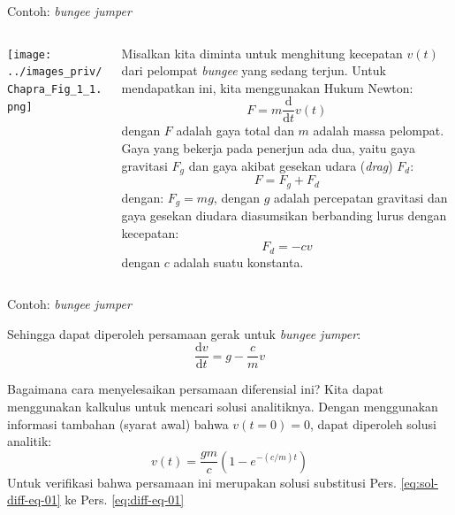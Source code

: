 \begin{frame}{Contoh: \emph{bungee jumper}}

\fontsize{9pt}{10pt}\selectfont

\begin{columns}

\begin{column}{0.2\textwidth}

\texttt{[image: ../images\_priv/Chapra\_Fig\_1\_1.png]}

\end{column}

\begin{column}{0.8\textwidth}
Misalkan kita diminta untuk menghitung kecepatan $v(t)$ dari pelompat
\emph{bungee} yang sedang terjun. Untuk mendapatkan ini, kita
menggunakan Hukum Newton:
\begin{equation*}
F = m \frac{\mathrm{d}}{\mathrm{d}t} v(t)
\end{equation*}
dengan $F$ adalah gaya total dan $m$ adalah massa pelompat.
Gaya yang bekerja pada penerjun ada dua, yaitu gaya gravitasi \(F_{g}\) dan
gaya akibat gesekan udara (\emph{drag})
$F_{d}$:
\begin{equation*}
F = F_{g} + F_{d}
\end{equation*}
dengan: $F_{g} = mg$, dengan $g$ adalah percepatan gravitasi dan gaya
gesekan diudara diasumsikan berbanding lurus dengan kecepatan:
\begin{equation*}
F_{d} = -c v  
\end{equation*}
dengan $c$ adalah suatu konstanta.
\end{column}

\end{columns}

\end{frame}


\begin{frame}{Contoh: \emph{bungee jumper}}

Sehingga dapat diperoleh persamaan gerak untuk \emph{bungee jumper}:
\begin{equation}
\frac{\mathrm{d}v}{\mathrm{d}t} = g - \frac{c}{m}v
\label{eq:diff-eq-01}
\end{equation}

Bagaimana cara menyelesaikan persamaan diferensial ini? Kita dapat
menggunakan kalkulus untuk mencari solusi analitiknya. Dengan
menggunakan informasi tambahan (syarat awal) bahwa $v(t=0)=0$, dapat
diperoleh solusi analitik:
\begin{equation}
v(t) = \frac{gm}{c}\left( 1 - e^{-(c/m)t} \right)
\label{eq:sol-diff-eq-01}
\end{equation}
Untuk verifikasi bahwa
persamaan ini merupakan solusi substitusi
Pers. \eqref{eq:sol-diff-eq-01} ke Pers. \eqref{eq:diff-eq-01}
\end{frame}



